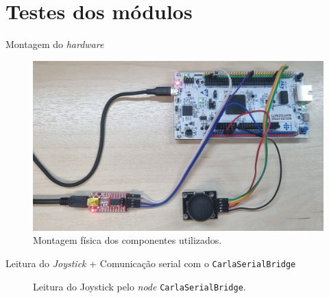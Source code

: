 \documentclass{if-beamer}
\begin{document}
\section{Testes dos módulos}

\begin{frame}{Montagem do \textit{hardware}}
	
	\begin{figure}[H]
		\centering
		\includegraphics[width=0.8\linewidth]{montagem}
		\caption{Montagem física dos componentes utilizados.}
		\label{fig:somevideo}
	\end{figure}
	
	
	
\end{frame}

\begin{frame}{Leitura do \textit{Joystick} + Comunicação serial com o \texttt{CarlaSerialBridge}}
	
	\begin{figure}[H]
		\centering
		\caption{Leitura do Joystick pelo \textit{node} \texttt{CarlaSerialBridge}.}
		\label{fig:TestJoyADC}
	\end{figure}
	
\end{frame}       
\end{document}
